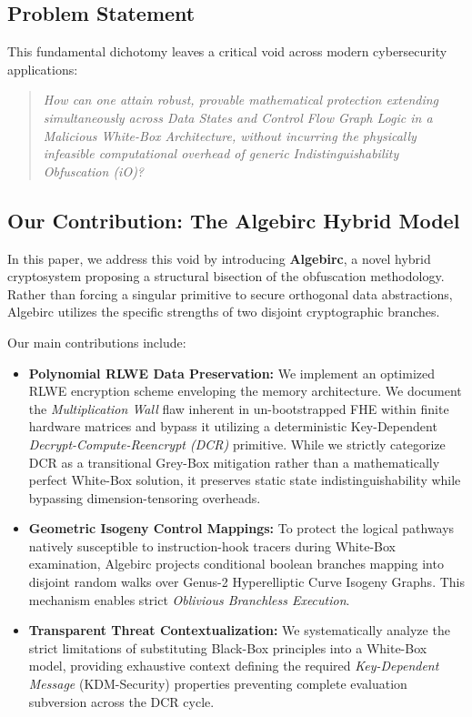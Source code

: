 \subsection{Problem Statement}
This fundamental dichotomy leaves a critical void across modern cybersecurity applications: 
\begin{quote}
\textit{How can one attain robust, provable mathematical protection extending simultaneously across Data States and Control Flow Graph Logic in a Malicious White-Box Architecture, without incurring the physically infeasible computational overhead of generic Indistinguishability Obfuscation (iO)?}
\end{quote}

\subsection{Our Contribution: The Algebirc Hybrid Model}
In this paper, we address this void by introducing \textbf{Algebirc}, a novel hybrid cryptosystem proposing a structural bisection of the obfuscation methodology. Rather than forcing a singular primitive to secure orthogonal data abstractions, Algebirc utilizes the specific strengths of two disjoint cryptographic branches.

Our main contributions include:
\begin{itemize}
    \item \textbf{Polynomial RLWE Data Preservation:} We implement an optimized RLWE encryption scheme enveloping the memory architecture. We document the \textit{Multiplication Wall} flaw inherent in un-bootstrapped FHE within finite hardware matrices and bypass it utilizing a deterministic Key-Dependent \textit{Decrypt-Compute-Reencrypt (DCR)} primitive. While we strictly categorize DCR as a transitional Grey-Box mitigation rather than a mathematically perfect White-Box solution, it preserves static state indistinguishability while bypassing dimension-tensoring overheads.
    \item \textbf{Geometric Isogeny Control Mappings:} To protect the logical pathways natively susceptible to instruction-hook tracers during White-Box examination, Algebirc projects conditional boolean branches mapping into disjoint random walks over Genus-2 Hyperelliptic Curve Isogeny Graphs. This mechanism enables strict \textit{Oblivious Branchless Execution}.
    \item \textbf{Transparent Threat Contextualization:} We systematically analyze the strict limitations of substituting Black-Box principles into a White-Box model, providing exhaustive context defining the required \textit{Key-Dependent Message} (KDM-Security) \cite{bh20} properties preventing complete evaluation subversion across the DCR cycle.
\end{itemize}


